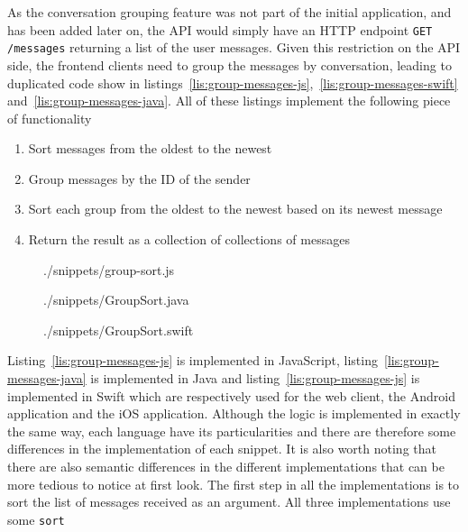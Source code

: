 As the conversation grouping feature was not part of the initial application,
and has been added later on, the API would simply have an HTTP endpoint
\lstinline{GET /messages} returning a list of the user messages. Given this
restriction on the API side, the frontend clients need to group the messages by
conversation, leading to duplicated code show in
listings~\ref{lis:group-messages-js},~\ref{lis:group-messages-swift}
and~\ref{lis:group-messages-java}. All of these listings implement the
following piece of functionality
\begin{enumerate}
\item Sort messages from the oldest to the newest
\item Group messages by the ID of the sender
\item Sort each group from the oldest to the newest based on its newest message
\item Return the result as a collection of collections of messages
\end{enumerate}
%
\begin{figure}
  
    {./snippets/group-sort.js}
\end{figure}
%
\begin{figure}
  
    {./snippets/GroupSort.java}
\end{figure}
%
\begin{figure}
  
    {./snippets/GroupSort.swift}
\end{figure}
%
Listing~\ref{lis:group-messages-js} is implemented in JavaScript,
listing~\ref{lis:group-messages-java} is implemented in Java and
listing~\ref{lis:group-messages-js} is implemented in Swift which are
respectively used for the web client, the Android application and the iOS
application. Although the logic is implemented in exactly the same way, each
language have its particularities and there are therefore some differences in
the implementation of each snippet. It is also worth noting that there are also
semantic differences in the different implementations that can be more tedious
to notice at first look.
The first step in all the implementations is to sort the list of messages
received as an argument. All three implementations use some \lstinline{sort}
